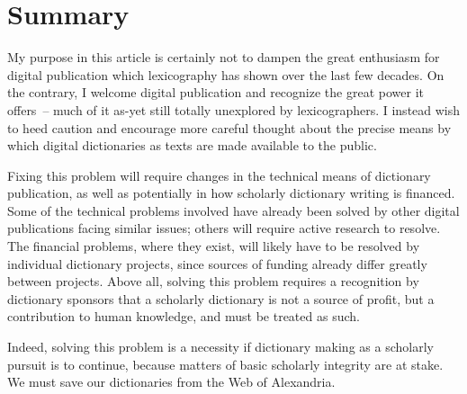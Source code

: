 \documentclass[output=paper]{langscibook}
\begin{document}
\section{Summary}\label{summary}

My purpose in this article is certainly not to dampen the great enthusiasm for digital publication which lexicography has shown over the last few decades. On the contrary, I welcome digital publication and
recognize the great power it offers~-- much of it as-yet still totally
unexplored by lexicographers. I instead wish to heed caution and
encourage more careful thought about the precise means by which digital
dictionaries as texts are made available to the public.

Fixing this problem will require changes in the technical means of
dictionary publication, as well as potentially in how scholarly
dictionary writing is financed. Some of the technical problems involved
have already been solved by other digital publications facing similar
issues; others will require active research to resolve. The financial
problems, where they exist, will likely have to be resolved by
individual dictionary projects, since sources of funding already differ
greatly between projects. Above all, solving this problem requires a
recognition by dictionary sponsors that a scholarly dictionary is not a
source of profit, but a contribution to human knowledge, and must be
treated as such.

Indeed, solving this problem is a necessity if dictionary making as a
scholarly pursuit is to continue, because matters of basic scholarly
integrity are at stake. We must save our dictionaries from the Web of
Alexandria.

{\sloppy\printbibliography[heading=subbibliography,notkeyword=this]}
\end{document}
